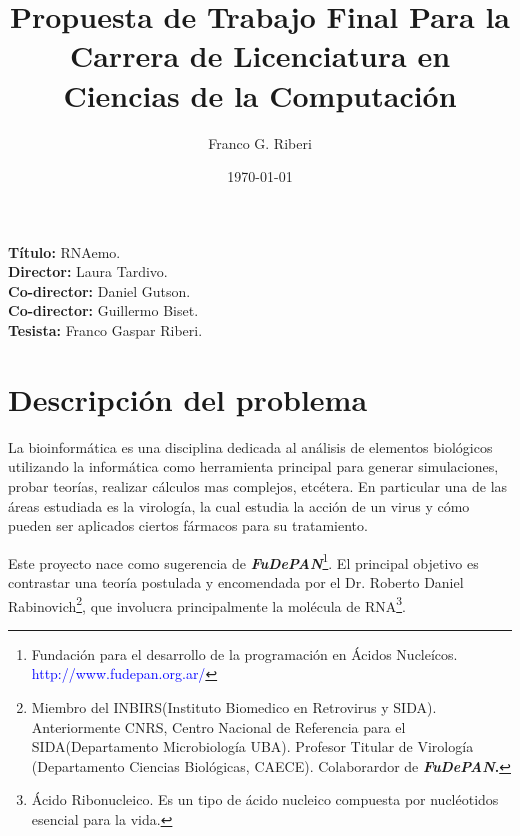 \documentclass[12pt,a4paper]{article}
\begin{document}
 

\title{Propuesta de Trabajo Final Para la Carrera de Licenciatura en Ciencias de la Computación}
		\vskip 2cm
\author{Franco G. Riberi}
		\vskip 2cm
\date{\today} 	

\maketitle

\noindent \textbf{Título:} RNAemo. \\
\vskip 0.01cm
\noindent \textbf{Director:} Laura Tardivo.\\ 
\vskip 0.01cm
\noindent \textbf{Co-director:}  Daniel Gutson.\\
\vskip 0.01cm
\noindent \textbf{Co-director:}  Guillermo Biset.\\
\vskip 0.01cm
\noindent \textbf{Tesista:} Franco Gaspar Riberi. \\

\section{Descripción del problema}

\par La bioinformática es una disciplina dedicada al análisis de elementos biológicos utilizando la
informática como herramienta principal para generar simulaciones, probar teorías,  realizar cálculos mas complejos, etcétera. En particular una de las áreas estudiada es la virología, la cual estudia la acción de un virus y cómo pueden ser aplicados ciertos fármacos para su tratamiento. 

\par Este proyecto nace como sugerencia de \textbf{\textit{FuDePAN}}\footnote{Fundación para el desarrollo de la programación en Ácidos Nucleícos. \textcolor{blue}{http://www.fudepan.org.ar/}}. El principal objetivo es contrastar una teoría postulada y encomendada por el Dr. Roberto Daniel Rabinovich\footnote{Miembro del INBIRS(Instituto Biomedico en Retrovirus y SIDA). Anteriormente CNRS, Centro Nacional de Referencia para el SIDA(Departamento Microbiología UBA). Profesor Titular de Virología (Departamento Ciencias Biológicas, CAECE). Colaborardor de \textbf{\textit{FuDePAN}.}}, que involucra principalmente la molécula de RNA\footnote{Ácido Ribonucleico. Es un tipo de ácido nucleico compuesta por nucléotidos esencial para la vida.}.
\end{document}
